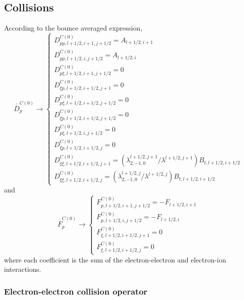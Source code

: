 

\label{fpdiscretephysproc}

\subsection{Collisions}

According to the bounce averaged expression,
\begin{equation}
\overline{\overline{D}}_{p}^{C\left( 0\right) }\rightarrow \left\{
\begin{array}{l}
D_{pp,l+1/2,i+1,j+1/2}^{C\left( 0\right) }=A_{l+1/2,i+1} \\
D_{pp,l+1/2,i,j+1/2}^{C\left( 0\right) }=A_{l+1/2,i} \\
D_{p\xi ,l+1/2,i+1,j+1/2}^{C\left( 0\right) }=0 \\
D_{\xi p,l+1/2,i+1/2,j+1}^{C\left( 0\right) }=0 \\
D_{p\xi ,l+1/2,i+1/2,j+1/2}^{C\left( 0\right) }=0 \\
D_{\xi p,l+1/2,i+1/2,j+1/2}^{C\left( 0\right) }=0 \\
D_{p\xi ,l+1/2,i,j+1/2}^{C\left( 0\right) }=0 \\
D_{\xi p,l+1/2,i+1/2,j}^{C\left( 0\right) }=0 \\
D_{\xi \xi ,l+1/2,i+1/2,j+1}^{C\left( 0\right) }=\left( \lambda
_{2,-1,0}^{l+1/2,j+1}/\lambda ^{l+1/2,j+1}\right) B_{t,l+1/2,i+1/2} \\
D_{\xi \xi ,l+1/2,i+1/2,j}^{C\left( 0\right) }=\left( \lambda
_{2,-1,0}^{l+1/2,j}/\lambda ^{l+1/2,j}\right) B_{t,l+1/2,i+1/2}
\end{array}
\right.
\end{equation}
and
\begin{equation}
\overline{\overline{F}}_{p}^{C\left( 0\right) }\rightarrow \left\{
\begin{array}{l}
F_{p,l+1/2,i+1,j+1/2}^{C\left( 0\right) }=-F_{l+1/2,i+1} \\
F_{p,l+1/2,i,j+1/2}^{C\left( 0\right) }=-F_{l+1/2,i} \\
F_{\xi ,l+1/2,i+1/2,j+1}^{C\left( 0\right) }=0 \\
F_{\xi ,l+1/2,i+1/2,j}^{C\left( 0\right) }=0
\end{array}
\right.
\end{equation}
where each coefficient is the sum of the electron-electron and electron-ion
interactions.

\subsubsection{Electron-electron collision operator}


